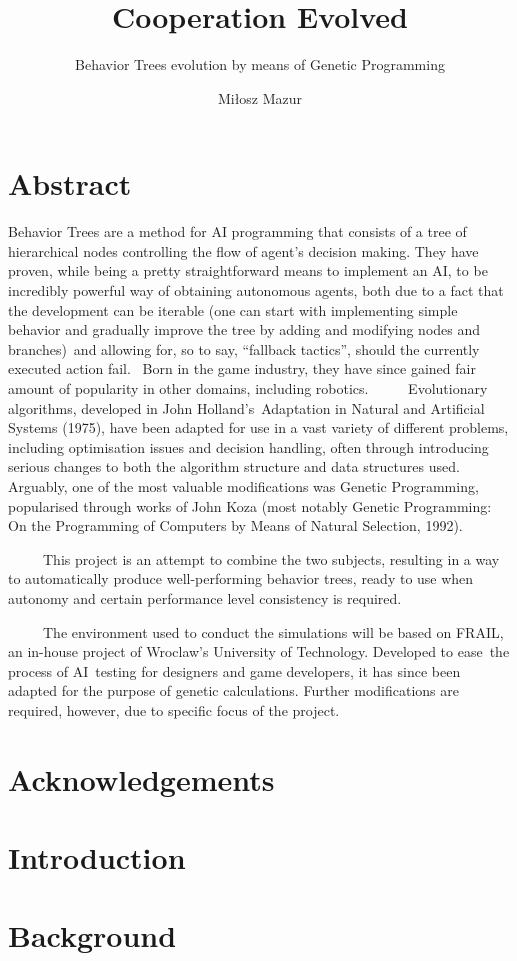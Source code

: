 \documentclass[12pt]{scrreprt}
\begin{document}
\author{Miłosz Mazur}
\title{Cooperation Evolved}
\subtitle{Behavior Trees evolution by means of Genetic Programming}
\maketitle


\newpage
\chapter*{Abstract}
Behavior Trees are a method for AI programming that consists of a tree of hierarchical nodes controlling the flow of agent's decision making. They have proven, while being a pretty straightforward means to implement an AI, to be incredibly powerful way of obtaining autonomous agents, both due to a fact that the development can be iterable (one can start with implementing simple behavior and gradually improve the tree by adding and modifying nodes and branches) and allowing for, so to say, ``fallback tactics'', should the currently executed action fail.  Born in the game industry, they have since gained fair amount of popularity in other domains, including robotics.
     Evolutionary algorithms, developed in John Holland’s Adaptation in Natural and Artificial Systems (1975), have been adapted for use in a vast variety of different problems, including optimisation issues and decision handling, often through introducing serious changes to both the algorithm structure and data structures used. Arguably, one of the most valuable modifications was Genetic Programming, popularised through works of John Koza (most notably Genetic Programming: On the Programming of Computers by Means of Natural Selection, 1992).

     This project is an attempt to combine the two subjects, resulting in a way to automatically produce well-performing behavior trees, ready to use when autonomy and certain performance level consistency is required.

     The environment used to conduct the simulations will be based on FRAIL, an in-house project of Wroclaw’s University of Technology. Developed to ease the process of AI testing for designers and game developers, it has since been adapted for the purpose of genetic calculations. Further modifications are required, however, due to specific focus of the project.

\chapter*{Acknowledgements}

\tableofcontents

\chapter{Introduction}


\chapter{Background}


\end{document}
